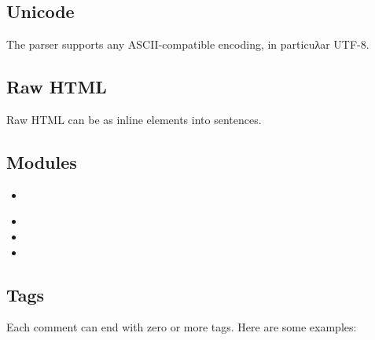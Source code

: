 \subsection{Unicode\label{unicode}}%
The parser supports any ASCII-compatible encoding, in particuλar UTF-8.

\subsection{Raw HTML\label{raw-html}}%
Raw HTML can be  as inline elements into sentences.

\subsection{Modules\label{modules}}%
\begin{itemize}\item{}\end{itemize}%
\begin{itemize}\item{}%
\item{}%
\item{}\end{itemize}%
\subsection{Tags\label{tags}}%
Each comment can end with zero or more tags. Here are some examples:

